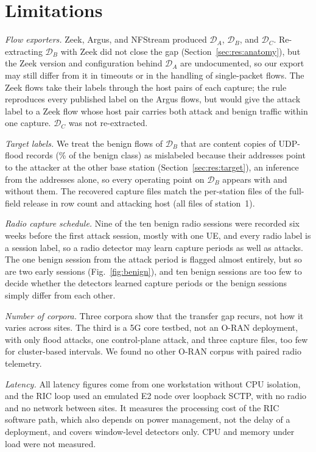 \documentclass{ieeeaccess}
\newcommand{\DA}{\ensuremath{\mathcal{D}_{A}}}
\newcommand{\DB}{\ensuremath{\mathcal{D}_{B}}}
\newcommand{\DC}{\ensuremath{\mathcal{D}_{C}}}
\begin{document}
\section{Limitations}
\label{sec:limitations}

\emph{Flow exporters.} Zeek, Argus, and NFStream produced \DA{}, \DB{}, and \DC{}. Re-extracting \DB{} with Zeek did not close the gap (Section~\ref{sec:res:anatomy}), but the Zeek version and configuration behind \DA{} are undocumented, so our export may still differ from it in timeouts or in the handling of single-packet flows. The Zeek flows take their labels through the host pairs of each capture; the rule reproduces every published label on the Argus flows, but would give the attack label to a Zeek flow whose host pair carries both attack and benign traffic within one capture. \DC{} was not re-extracted.

\emph{Target labels.} We treat the benign flows of \DB{} that are content copies of UDP-flood records (\LcBenignTwinPct\% of the benign class) as mislabeled because their addresses point to the attacker at the other base station (Section~\ref{sec:res:target}), an inference from the addresses alone, so every operating point on \DB{} appears with and without them. The recovered capture files match the per-station files of the full-field release in row count and attacking host (all \LcSiteFiles{} files of station~1).

\emph{Radio capture schedule.} Nine of the ten benign radio sessions were recorded six weeks before the first attack session, mostly with one UE, and every radio label is a session label, so a radio detector may learn capture periods as well as attacks. The one benign session from the attack period is flagged almost entirely, but so are two early sessions (Fig.~\ref{fig:benign}), and ten benign sessions are too few to decide whether the detectors learned capture periods or the benign sessions simply differ from each other.

\emph{Number of corpora.} Three corpora show that the transfer gap recurs, not how it varies across sites. The third is a 5G core testbed, not an O-RAN deployment, with only flood attacks, one control-plane attack, and three capture files, too few for cluster-based intervals. We found no other O-RAN corpus with paired radio telemetry.

\emph{Latency.} All latency figures come from one workstation without CPU isolation, and the RIC loop used an emulated E2 node over loopback SCTP, with no radio and no network between sites. It measures the processing cost of the RIC software path, which also depends on power management, not the delay of a deployment, and covers window-level detectors only. CPU and memory under load were not measured.
\end{document}
